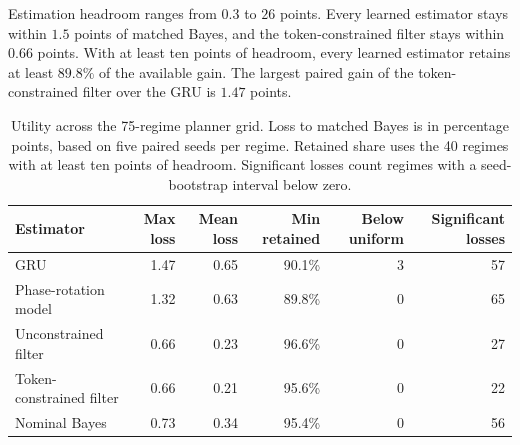 Estimation headroom ranges from $0.3$ to $26$ points. Every learned
estimator stays within $1.5$ points of matched Bayes, and the
token-constrained filter stays within $0.66$ points. With at least ten
points of headroom, every learned estimator retains at least $89.8\%$ of
the available gain. The largest paired gain of the token-constrained
filter over the GRU is $1.47$ points.

\begin{table}[H]
\centering\small
\caption{Utility across the 75-regime planner grid. Loss to matched Bayes is
in percentage points, based on five paired seeds per regime. Retained share
uses the 40 regimes with at least ten points of headroom. Significant
losses count regimes with a seed-bootstrap interval below zero.}
\label{tab:regimes}
\begin{tabular}{lrrrrr}
\toprule
Estimator & Max loss & Mean loss & Min retained & Below uniform & Significant losses \\
\midrule
GRU & 1.47 & 0.65 & 90.1\% & 3 & 57 \\
Phase-rotation model & 1.32 & 0.63 & 89.8\% & 0 & 65 \\
Unconstrained filter & 0.66 & 0.23 & 96.6\% & 0 & 27 \\
Token-constrained filter & 0.66 & 0.21 & 95.6\% & 0 & 22 \\
Nominal Bayes & 0.73 & 0.34 & 95.4\% & 0 & 56 \\
\bottomrule
\end{tabular}
\end{table}

\FloatBarrier
